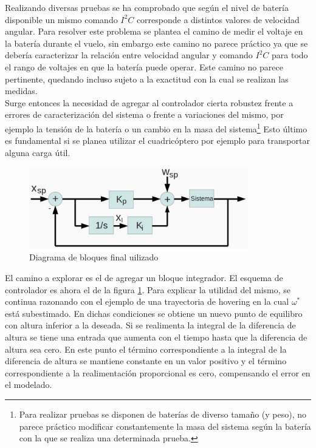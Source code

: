 \documentclass[main]{subfiles}
\begin{document}
Realizando diversas pruebas se ha comprobado que seg\'un el nivel de bater\'ia disponible un mismo comando $I^2C$ corresponde a distintos valores de velocidad angular. Para resolver este problema se plantea el camino de medir el voltaje en la bater\'ia durante el vuelo, sin embargo este camino no parece pr\'actico ya que se deber\'ia caracterizar la relaci\'on entre velocidad angular y comando $I^2C$ para todo el rango de voltajes en que la bater\'ia puede operar. Este camino no parece pertinente, quedando incluso sujeto a la exactitud con la cual se realizan las medidas.\\

Surge entonces la necesidad de agregar al controlador cierta robustez frente a errores de caracterizaci\'on del sistema o frente a variaciones del mismo, por ejemplo la tensi\'on de la bater\'ia o un cambio en la masa del sistema\footnote{Para realizar pruebas se disponen de bater\'ias de diverso tamaño (y peso), no parece pr\'actico modificar constantemente la masa del sistema seg\'un la bater\'ia con la que se realiza una determinada prueba.} Esto \'ultimo es fundamental si se planea utilizar el cuadric\'optero por ejemplo para transportar alguna carga \'util.\\

\begin{figure}[h!]
	\centering
	\vspace{-20pt}
	\includegraphics[width=0.85\textwidth]{./pics_control/diagrama_bloques_completo.pdf}
	\caption{Diagrama de bloques final uilizado}
	\label{fig:bloque2}
\end{figure}

El camino a explorar es el de agregar un bloque integrador. El esquema de controlador es ahora el de la figura \ref{fig:bloque2}. Para explicar la utilidad del mismo, se continua razonando con el ejemplo de una trayectoria de hovering en la cual $\omega^*$ est\'a subestimado. En dichas condiciones se obtiene un nuevo punto de equilibro con altura inferior a la deseada. Si se realimenta la integral de la diferencia de altura se tiene una entrada que aumenta con el tiempo hasta que la diferencia de altura sea cero. En este punto el t\'ermino correspondiente a la integral de la diferencia de altura se mantiene constante en un valor positivo y el t\'ermino correspondiente a la realimentaci\'on proporcional es cero, compensando el error en el modelado.\\
\end{document}
